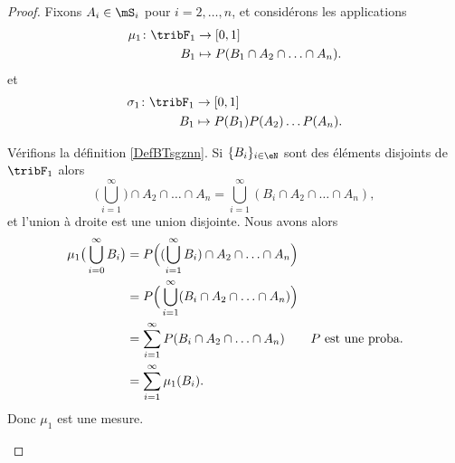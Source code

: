 \begin{proof}
	Fixons \( A_i\in\mS_i\) pour \( i=2,\ldots,n\), et considérons les applications
	\begin{equation}
		\begin{aligned}
			\mu_1\colon \tribF_1 & \to \mathopen[ 0,1\mathclose]             \\
			B_1                  & \mapsto P(B_1\cap A_2\cap\ldots\cap A_n).
		\end{aligned}
	\end{equation}
	et
	\begin{equation}
		\begin{aligned}
			\sigma_1\colon \tribF_1 & \to \mathopen[ 0,1\mathclose]      \\
			B_1                     & \mapsto P(B_1)P(A_2)\ldots P(A_n).
		\end{aligned}
	\end{equation}
	\begin{subproof}
		Vérifions la définition \ref{DefBTsgznn}. Si \( \{ B_i \}_{i\in \eN}\) sont des éléments disjoints de \( \tribF_1\) alors
		\begin{equation}
			\big( \bigcup_{i=1}^{\infty} \big)\cap A_2\cap\ldots\cap A_n=\bigcup_{i=1}^{\infty}(B_i\cap A_2\cap\ldots\cap A_n),
		\end{equation}
		et l'union à droite est une union disjointe. Nous avons alors
		\begin{subequations}
			\begin{align}
				\mu_1\big( \bigcup_{i=0}^{\infty}B_i \big) & =P\Big( (\bigcup_{i=1}^{\infty}B_i)\cap A_2\cap\ldots\cap A_n \Big)                                \\
				                                           & =P\Big( \bigcup_{i=1}^{\infty}(B_i\cap A_2\cap\ldots\cap A_n) \Big)                                \\
				                                           & =\sum_{i=1}^{\infty}P(B_i\cap A_2\cap\ldots\cap A_n)                & \text{\( P\) est une proba.} \\
				                                           & =\sum_{i=1}^{\infty}\mu_1(B_i).
			\end{align}
		\end{subequations}
		Donc \( \mu_1\) est une mesure.


\end{subproof}
\end{proof}
